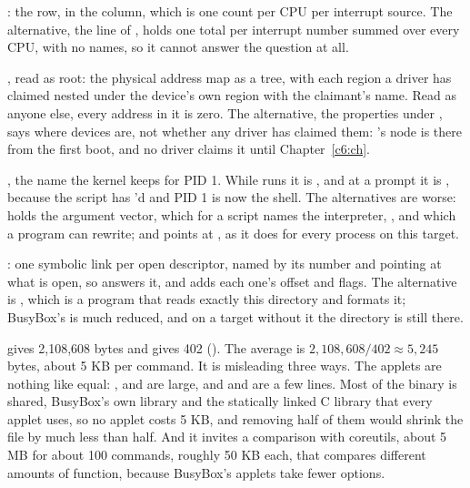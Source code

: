  : the  row, in the  column, which is one
count per CPU per interrupt source. The alternative, the  line of ,
holds one total per interrupt number summed over every CPU, with no names, so it cannot answer the
question at all.

 , read as root: the physical address map as a tree, with each region a
driver has claimed nested under the device's own region with the claimant's name. Read as anyone
else, every address in it is zero. The alternative, the  properties under
, says where devices are, not whether any driver has claimed
them: 's node is there from the first boot, and no driver claims it until
Chapter~\ref{c6:ch}.

 , the name the kernel keeps for PID 1. While  runs it is
, and at a  prompt it is , because the script has
'd  and PID 1 is now the shell. The alternatives are worse:
 holds the argument vector, which for a script names the interpreter,
, and which a program can rewrite; and  points at
, as it does for every process on this target.

 : one symbolic link per open descriptor, named by its number and
pointing at what is open, so  answers it, and 
adds each one's offset and flags. The alternative is , which is a program that reads
exactly this directory and formats it; BusyBox's is much reduced, and on a target without it the
directory is still there.


  gives 2,108,608 bytes and  gives
402 (). The average is $2{,}108{,}608 / 402 \approx 5{,}245$ bytes, about 5 KB per
command. It is misleading three ways. The applets are nothing like equal: ,  and
 are large, and  and  are a few lines. Most of the binary is shared,
BusyBox's own library and the statically linked C library that every applet uses, so no applet costs
5 KB, and removing half of them would shrink the file by much less than half. And it invites a
comparison with coreutils, about 5 MB for about 100 commands, roughly 50 KB each, that compares
different amounts of function, because BusyBox's applets take fewer options.

